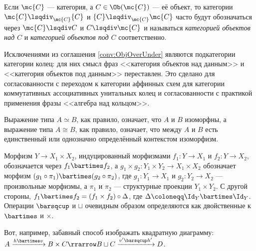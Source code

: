 \documentclass[
	extrafontsizes,
	11pt,
	hyphens,
]{memoir}
\begin{document}
\begin{convention}
\label{conv:ObjOverUnder}
Если \(\mc{C}\) --- категория, а \(C \in \Ob(\mc{C})\) --- её объект,
то категории \(\mc{C} \lsqdiv_{\mc{C}} \{C\}\) и \(\{C\} \lsqdiv_{\mc{C}} \mc{C}\) часто будут обозначаться через \(\mc{C} \lsqdiv C\) и \(C \lsqdiv \mc{C}\)
и называться \emph{категорией объектов над \(C\)} и \emph{категорией объектов под \(C\)} соответственно.
\end{convention}

\begin{convention}
Исключениями из соглашения \ref{conv:ObjOverUnder} являются подкатегории категории колец: для них смысл фраз <<категория объектов над данным>> и <<категория объектов под данным>> переставлен.
Это сделано для согласованности с переходом к категории аффинных схем для категории коммутативных ассоциативных унитальных колец и согласованности с практикой применения фразы <<алгебра над кольцом>>.
\end{convention}

\begin{notation}
Выражение типа \(A \simeq B\), как правило, означает, что \(A\) и \(B\) изоморфны, а выражение типа \(A \cong B\), как правило, означает, что между \(A\) и \(B\) есть единственный или однозначно определённый контекстом изоморфизм.
\end{notation}

\begin{notation}
\label{not:MorProdCoprod}
Морфизм \(Y \to X_1 \times X_2\), индуцированный морфизмами \(f_1: Y \to X_1\) и \(f_2 : Y \to X_2\),
обозначается через \(f_1 \bartimes f_2\),
а \(g_1 \times g_2 : Y_1 \times Y_2 \to X_1 \times X_2\) обозначает морфизм \((g_1 \circ \pi_1) \bartimes (g_2 \circ \pi_2)\), где \(g_1 : Y_1 \to X_1\) и \(g_2 : Y_2 \to X_2\) --- произвольные морфизмы, а \(\pi_1\) и \(\pi_2\) --- структурные проекции \(Y_1 \times Y_2\).
С другой стороны, \(f_1 \bartimes f_2 = (f_1 \times f_2) \circ \Delta\), где \(\Delta \coloneqq \Id_Y \bartimes \Id_Y\).
Операции \(\barsqcup\) и \(\sqcup\) очевидным образом определяются как двойственные к \(\bartimes\) и \(\times\).
\end{notation}

\begin{example}
Вот, например, забавный способ изображать квадратную диаграмму:
\(A \xrightarrow{h \bartimes v} B \times C \rrarrow B \sqcup C \xrightarrow{v' \barsqcup h'} D\).
\end{example}
\end{document}
